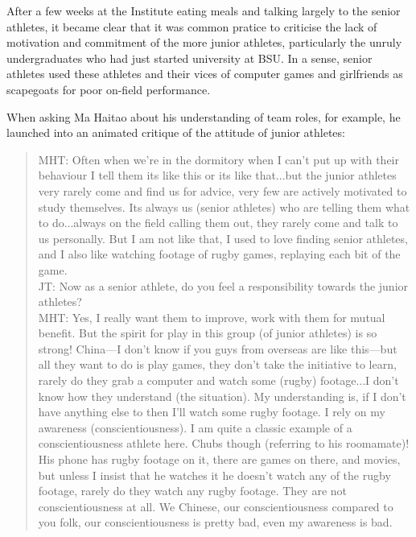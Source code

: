 \begin{CJK}{UTF8}{gbsn}
After a few weeks at the Institute eating meals and talking largely to the senior athletes, it became clear that it was common pratice to criticise the lack of motivation and commitment of the more junior athletes, particularly the unruly undergraduates who had just started university at BSU.  In a sense, senior athletes used these athletes and their vices of computer games and girlfriends as scapegoats for poor on-field performance.

When asking Ma Haitao about his understanding of team roles, for example, he launched into an animated critique of the attitude of junior athletes:


  \begin{quotation}
    MHT: Often when we're in the dormitory when I can't put up with their behaviour I tell them its like this or its like that...but the junior athletes very rarely come and find us for advice, very few are actively motivated to study themselves. Its always us (senior athletes) who are telling them what to do...always on the field calling them out, they rarely come and talk to us personally.  But I am not like that, I used to love finding senior athletes, and I also like watching footage of rugby games, replaying each bit of the game.\\
    JT: Now as a senior athlete, do you feel a responsibility towards the junior athletes?\\
    MHT: Yes, I really want them to improve, work with them for mutual benefit.  But the spirit for play in this group (of junior athletes) is so strong!  China---I don't know if you guys from overseas are like this---but all they want to do is play games, they don't take the initiative to learn, rarely do they grab a computer and watch some (rugby) footage...I don’t know how they understand (the situation).  My understanding is, if I don’t have anything else to then I’ll watch some rugby footage. I rely on my awareness (conscientiousness).  I am quite a classic example of a conscientiousness athlete here.  Chubs though (referring to his roomamate)!  His phone has rugby footage on it, there are games on there, and movies, but unless I insist that he watches it he doesn't watch any of the rugby footage, rarely do they watch any rugby footage.  They are not conscientiousness at all. We Chinese, our conscientiousness compared to you folk, our conscientiousness is pretty bad, even my awareness is bad.
  \end{quotation}


\end{CJK}
